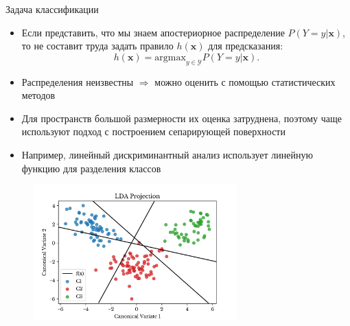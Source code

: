 \documentclass{beamer}
\begin{document}
\begin{frame}{Задача классификации}
    \scriptsize

    \begin{itemize}
        \item Если представить, что мы знаем апостериорное распределение $P(Y = y | \bm{x})$, то не составит труда задать правило $h(\bm{x})$ для предсказания:
        \begin{equation}
            h(\bm{x}) = \text{argmax}_{y \in \mathcal{Y}} P(Y = y | \bm{x}).
        \end{equation}
        \item Распределения неизвестны $\Longrightarrow$ можно оценить с помощью статистических методов
        \item Для пространств большой размерности их оценка затруднена, поэтому чаще используют подход с построением сепарирующей поверхности
        \item  Например, линейный дискриминантный анализ использует линейную функцию для разделения классов
    \end{itemize}

    \vspace{-7pt}

    \begin{figure}[H]
        \includegraphics[width=0.7\textwidth]{lda.png}
    \end{figure}

\end{frame}
\end{document}
